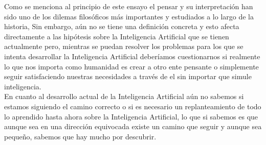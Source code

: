 \documentclass[12pt]{article}
\begin{document}
Como se menciona al principio de este ensayo el pensar y su interpretación han sido uno de los dilemas filosóficos más importantes y estudiados a lo largo de la historia, Sin embargo, aún no se tiene una definición concreta y esto afecta directamente a las hipótesis sobre la Inteligencia Artificial que se tienen actualmente pero, mientras se puedan resolver los problemas para los que se intenta desarrollar la Inteligencia Artificial deberíamos cuestionarnos si realmente lo que nos importa como humanidad es crear a otro ente pensante o simplemente seguir satisfaciendo nuestras necesidades a través de el sin importar que simule inteligencia.\\

En cuanto al desarrollo actual de la Inteligencia Artificial aún no sabemos si estamos siguiendo el camino correcto o si es necesario un replanteamiento de todo lo aprendido hasta ahora sobre la Inteligencia Artificial, lo que si sabemos es que aunque sea en una dirección equivocada existe un camino que seguir y aunque sea pequeño, sabemos que hay mucho por descubrir.
\end{document}

